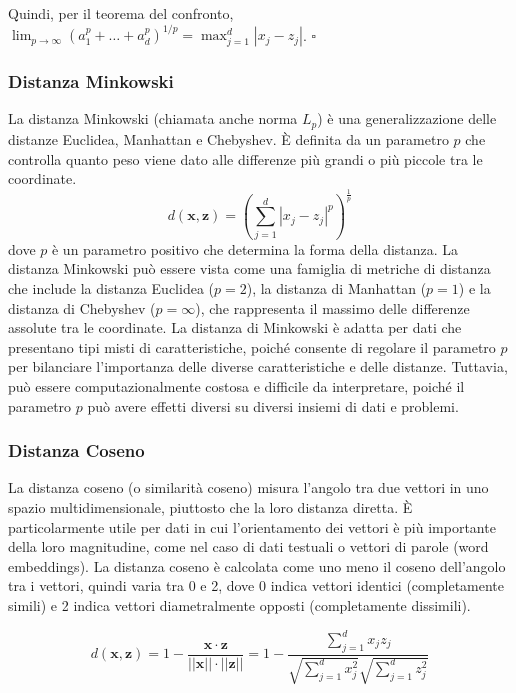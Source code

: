     Quindi, per il teorema del confronto, $\lim_{p \to \infty} (a^p_1 + \ldots + a^p_d)^{1/p} = \max_{j=1}^d |x_j - z_j|$. $\square$

\subsubsection{Distanza Minkowski} La distanza Minkowski (chiamata anche norma $L_p$) è
    una generalizzazione delle distanze Euclidea, Manhattan e Chebyshev. 
    È definita da un parametro $p$ che controlla quanto peso viene dato alle differenze più 
    grandi o più piccole tra le coordinate.
    \[
    d(\mathbf{x}, \mathbf{z}) = \left( \sum_{j=1}^d |x_j - z_j|^p \right)^{\frac{1}{p}}
    \]
    dove \( p \) è un parametro positivo che determina la forma della distanza. La distanza 
    Minkowski può essere vista come una famiglia di metriche di distanza che include la 
    distanza Euclidea ($p = 2$), la distanza di Manhattan ($p = 1$) e la distanza di 
    Chebyshev ($p = \infty$), che rappresenta il massimo delle differenze assolute 
    tra le coordinate. La distanza di Minkowski è adatta per dati che presentano tipi misti 
    di caratteristiche, poiché consente di regolare il parametro $p$ per bilanciare 
    l'importanza delle diverse caratteristiche e delle distanze. Tuttavia, può essere 
    computazionalmente costosa e difficile da interpretare, poiché il parametro $p$ può 
    avere effetti diversi su diversi insiemi di dati e problemi.

\subsubsection{Distanza Coseno} La distanza coseno (o similarità coseno) misura 
    l'angolo tra due vettori in uno spazio multidimensionale, piuttosto che la loro distanza diretta. 
    È particolarmente utile per dati in cui l'orientamento dei vettori è più importante della loro 
    magnitudine, come nel caso di dati testuali o vettori di parole (word embeddings). La distanza 
    coseno è calcolata come uno meno il coseno dell'angolo tra i vettori, quindi varia tra 0 e 2, 
    dove 0 indica vettori identici (completamente simili) e 2 indica vettori diametralmente opposti 
    (completamente dissimili).

    \[
d(\mathbf{x}, \mathbf{z}) = 1 - \frac{\mathbf{x} \cdot \mathbf{z}}{||\mathbf{x}|| \cdot ||\mathbf{z}||} = 1 - \frac{\sum_{j=1}^d x_j z_j}{\sqrt{\sum_{j=1}^d x_j^2} \sqrt{\sum_{j=1}^d z_j^2}}
\]

